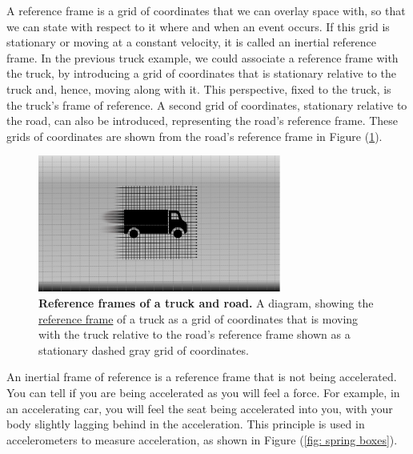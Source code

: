 A reference frame is a grid of coordinates that we can overlay space with, so that we can state with respect to it where and when an event occurs.
If this grid is stationary or moving at a constant velocity, it is called an inertial reference frame.
In the previous truck example, we could associate a reference frame with the truck, by introducing a grid of coordinates that is stationary relative to the truck and, hence, moving along with it.
This perspective, fixed to the truck, is the truck's frame of reference.
A second grid of coordinates, stationary relative to the road, can also be introduced, representing the road's reference frame.
These grids of coordinates are shown from the road's reference frame in Figure (\ref{fig: Reference Frames}).

\begin{figure}[H]
	\centering
	\includegraphics[width = 8cm]{images/pdf/Reference_Frames_of_truck_and_road.pdf}
	\caption{\textbf{Reference frames of a truck and road.} A diagram, showing the \protect\hyperlink{def-Reference-frame}{reference frame} of a truck as a grid of coordinates that is moving with the truck relative to the road's reference frame shown as a stationary dashed gray grid of coordinates.}
	\label{fig: Reference Frames}
\end{figure}

An inertial frame of reference is a reference frame that is not being accelerated.
You can tell if you are being accelerated as you will feel a force.
For example, in an accelerating car, you will feel the seat being accelerated into you, with your body slightly lagging behind in the acceleration.
This principle is used in accelerometers to measure acceleration, as shown in Figure (\ref{fig: spring boxes}).

